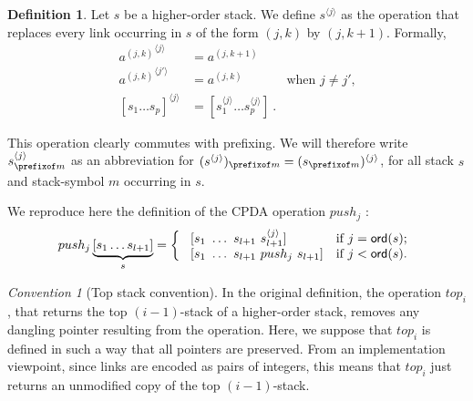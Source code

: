 \documentclass[a4paper]{article}
\theoremstyle{remark}
\newtheorem{convention}{Convention}[section]
\theoremstyle{definition}
\newtheorem{definition}{Definition}[section]
\begin{document}


\begin{definition}
Let $s$ be a higher-order stack. We define $s^{\langle j \rangle}$ as the operation that replaces
every link occurring in $s$ of the form $(j,k)$ by $(j,k+1)$. Formally,
\begin{align*}
{a^{(j,k)}}^{\langle j \rangle} &= a^{(j,k+1)}   \\
{a^{(j,k)}}^{\langle j' \rangle} &= a^{(j,k)} &   \mbox{when $j\neq j'$,}\\
[s_1 \ldots s_p]^{\langle j \rangle} &= [s_1^{\langle j \rangle} \ldots s_p^{\langle j \rangle}] \ .
\end{align*}
\end{definition}
This operation clearly commutes with prefixing. We will therefore write $s^{\langle j\rangle}_{\prefixof m}$ as an abbreviation for
$(s^{\langle j\rangle})_{\prefixof m} = (s_{\prefixof m})^{\langle j\rangle}$,
for all stack $s$ and stack-symbol $m$ occurring in $s$.


We reproduce here the definition of the CPDA operation $push_j$ \cite{hmos-lics08}:
$$ push_j \underbrace{[ s_1 \ldots s_{l+1} ]}_{s} =
\left\{
  \begin{array}{ll}
\    [s_1\ \ldots\ s_{l+1}\ s_{l+1}^{\langle j \rangle}]  &\hbox{if $j = {\sf ord}(s)$;}\\
\    [s_1\ \ldots\ s_{l+1}\ push_j\ s_{l+1}]  &\hbox{if $j<{\sf ord}(s)$.}
 \end{array}
\right.
$$


\begin{convention}[Top stack convention]
\label{conv:top_preserve_links}
In the original definition, the operation $top_i$, that returns the top $(i-1)$-stack of a higher-order stack,
 removes any dangling pointer resulting from the operation. Here, we suppose that $top_i$ is defined in such a way that all pointers are preserved. From an implementation viewpoint, since links are encoded as pairs of integers, this means that $top_i$ just returns an unmodified copy of the top $(i-1)$-stack.
\end{convention}
\end{document}
